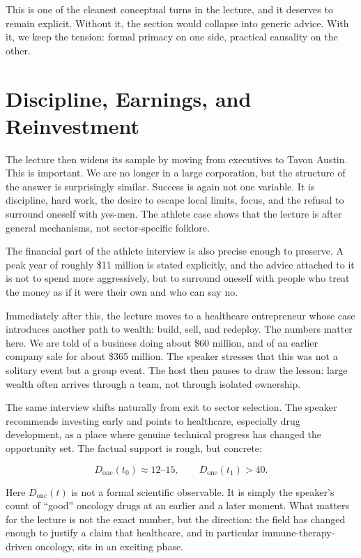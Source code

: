 This is one of the cleanest conceptual turns in the lecture, and it deserves to remain explicit. Without it, the section would collapse into generic advice. With it, we keep the tension: formal primacy on one side, practical causality on the other.

\section{Discipline, Earnings, and Reinvestment}

The lecture then widens its sample by moving from executives to Tavon Austin. This is important. We are no longer in a large corporation, but the structure of the answer is surprisingly similar. Success is again not one variable. It is discipline, hard work, the desire to escape local limits, focus, and the refusal to surround oneself with yes-men. The athlete case shows that the lecture is after general mechanisms, not sector-specific folklore.

The financial part of the athlete interview is also precise enough to preserve. A peak year of roughly \$11 million is stated explicitly, and the advice attached to it is not to spend more aggressively, but to surround oneself with people who treat the money as if it were their own and who can say no.

Immediately after this, the lecture moves to a healthcare entrepreneur whose case introduces another path to wealth: build, sell, and redeploy. The numbers matter here. We are told of a business doing about \$60 million, and of an earlier company sale for about \$365 million. The speaker stresses that this was not a solitary event but a group event. The host then pauses to draw the lesson: large wealth often arrives through a team, not through isolated ownership.

The same interview shifts naturally from exit to sector selection. The speaker recommends investing early and points to healthcare, especially drug development, as a place where genuine technical progress has changed the opportunity set. The factual support is rough, but concrete:

\begin{equation}
D_{\mathrm{onc}}(t_0) \approx 12\text{--}15,\qquad D_{\mathrm{onc}}(t_1) > 40.
\end{equation}

Here \(D_{\mathrm{onc}}(t)\) is not a formal scientific observable. It is simply the speaker's count of ``good'' oncology drugs at an earlier and a later moment. What matters for the lecture is not the exact number, but the direction: the field has changed enough to justify a claim that healthcare, and in particular immune-therapy-driven oncology, sits in an exciting phase.

